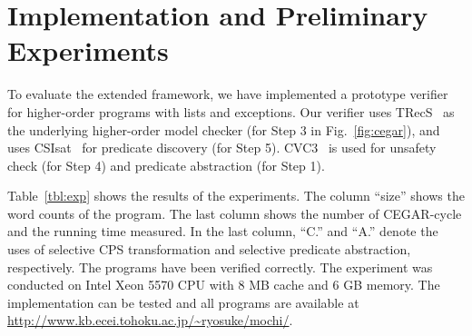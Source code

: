 \section{Implementation and Preliminary Experiments}
\label{sec:experiments}

To evaluate the extended framework, we have implemented a prototype
verifier for higher-order programs with lists and exceptions.
Our verifier uses TRecS~\cite{KobayashiPOPL2009,KobayashiPPDP2009} as
the underlying higher-order model checker (for Step 3 in
Fig.~\ref{fig:cegar}), and uses CSIsat~\cite{Beyer2008} for predicate
discovery (for Step 5).  CVC3~\cite{Barrett2007} is used for unsafety
check (for Step 4) and predicate abstraction (for Step 1).

Table~\ref{tbl:exp} shows the results of the experiments.  The column
``size'' shows the word counts of the program.  The last column shows
the number of CEGAR-cycle and the running time measured.  In the last
column, ``C.'' and ``A.'' denote the uses of selective CPS
transformation and selective predicate abstraction, respectively.  The
programs have been verified correctly.  The experiment was conducted on
Intel Xeon 5570 CPU with 8 MB cache and 6 GB memory.  The implementation
can be tested and all programs are available at
\url{http://www.kb.ecei.tohoku.ac.jp/~ryosuke/mochi/}.


